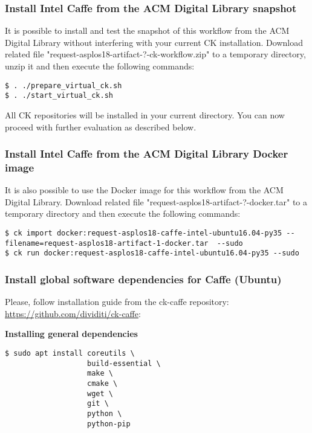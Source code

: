 \documentclass[sigplan]{acmart}
\begin{document}
\subsubsection{Install Intel Caffe from the ACM Digital Library snapshot}

It is possible to install and test the snapshot of this workflow 
from the ACM Digital Library without interfering with your current CK installation.
Download related file "request-asplos18-artifact-?-ck-workflow.zip"
to a temporary directory, unzip it and then execute the following commands:

\begin{verbatim}
$ . ./prepare_virtual_ck.sh
$ . ./start_virtual_ck.sh
\end{verbatim}

All CK repositories will be installed in your current directory.
You can now proceed with further evaluation as described below.

\subsubsection{Install Intel Caffe from the ACM Digital Library Docker image}

It is also possible to use the Docker image for this workflow 
from the ACM Digital Library. Download related file "request-asplos18-artifact-?-docker.tar"
to a temporary directory and then execute the following commands:

\begin{verbatim}
$ ck import docker:request-asplos18-caffe-intel-ubuntu16.04-py35 --filename=request-asplos18-artifact-1-docker.tar  --sudo
$ ck run docker:request-asplos18-caffe-intel-ubuntu16.04-py35 --sudo
\end{verbatim}

\subsubsection{Install global software dependencies for Caffe (Ubuntu)}

Please, follow installation guide from the ck-caffe repository: \url{https://github.com/dividiti/ck-caffe}:

\textbf{Installing general dependencies}

\begin{verbatim}
$ sudo apt install coreutils \
                   build-essential \
                   make \
                   cmake \
                   wget \
                   git \
                   python \
                   python-pip
\end{verbatim}
\end{document}

